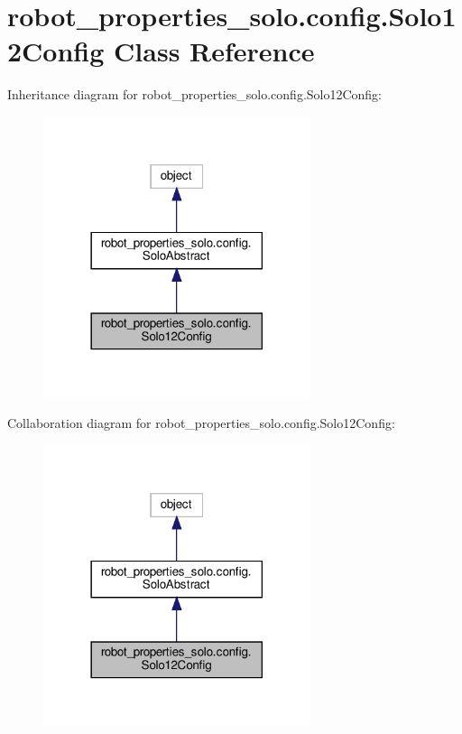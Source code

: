 \hypertarget{classrobot__properties__solo_1_1config_1_1Solo12Config}{}\section{robot\+\_\+properties\+\_\+solo.\+config.\+Solo12\+Config Class Reference}
\label{classrobot__properties__solo_1_1config_1_1Solo12Config}


Inheritance diagram for robot\+\_\+properties\+\_\+solo.\+config.\+Solo12\+Config\+:
\nopagebreak
\begin{figure}[H]
\begin{center}
\leavevmode
\includegraphics[width=222pt]{classrobot__properties__solo_1_1config_1_1Solo12Config__inherit__graph}
\end{center}
\end{figure}


Collaboration diagram for robot\+\_\+properties\+\_\+solo.\+config.\+Solo12\+Config\+:
\nopagebreak
\begin{figure}[H]
\begin{center}
\leavevmode
\includegraphics[width=222pt]{classrobot__properties__solo_1_1config_1_1Solo12Config__coll__graph}
\end{center}
\end{figure}
